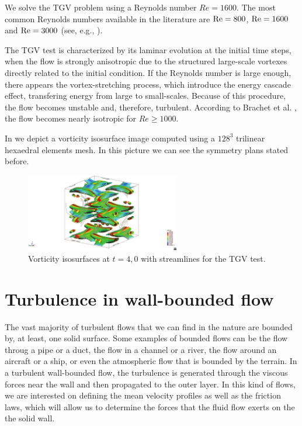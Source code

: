 We solve the TGV problem using a Reynolds number $Re=1600$. The most common Reynolds numbers available in the literature are ${\rm Re}=800$, ${\rm Re}=1600$ and ${\rm Re}=3000$ (see, e.g., \cite{andrea_d._beck_numerical_2012, fauconnier_construction_2009, gassner_accuracy_????, jb_chapelier_final_2012}).

The TGV test is characterized by its laminar evolution at the initial time steps, when the flow is strongly anisotropic due to the structured large-scale vortexes directly related to the initial condition. If the Reynolds number is large enough, there appears the vortex-stretching process, which introduce the energy cascade effect, transfering energy from large to small-scales. Because of this procedure, the flow becomes unstable and, therefore, turbulent. According to Brachet et al. \cite{brachet_small-scale_1983}, the flow becomes nearly isotropic for $Re\geq1000$.

In  we depict a vorticity isosurface image computed using a $128^3$ trilinear hexaedral elements mesh. In this picture we can see the symmetry plans stated before.

\begin{figure}[h!]
	\centering	
	\includegraphics[clip=true, trim=13cm 0cm 13cm 0cm, width=0.6\textwidth]{Figures/Chapter3/TGV_isovorti_streaml_veloc_1}
	\caption{Vorticity isosurfaces at $t=4,0$ with streamlines for the TGV test.}
	\label{fig-TGV_vorticity_streamlines}
\end{figure}

\section{Turbulence in wall-bounded flow}
\label{sec-C3_wall_bounded}
The vast majority of turbulent flows that we can find in the nature are bounded by, at least, one solid surface. Some examples of bounded flows can be the flow throug a pipe or a duct, the flow in a channel or a river, the flow around an aircraft or a ship, or even the atmospheric flow that is bounded by the terrain. In a turbulent wall-bounded flow, the turbulence is generated through the viscous forces near the wall and then propagated to the outer layer. In this kind of flows, we are interested on defining the mean velocity profiles as well as the friction laws, which will allow us to determine the forces that the fluid flow exerts on the the solid wall.
